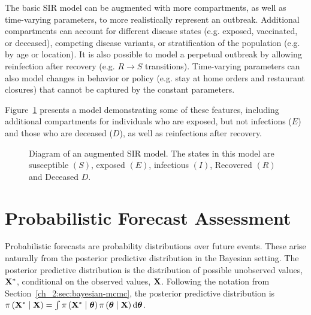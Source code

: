 The basic SIR model can be augmented with more compartments, as well as time-varying parameters, to more realistically represent an outbreak.
Additional compartments can account for different disease states (e.g. exposed, vaccinated, or deceased), competing disease variants, or stratification of the population (e.g. by age or location).
It is also possible to model a perpetual outbreak by allowing reinfection after recovery (e.g. \(R \to S\) transitions).
Time-varying parameters can also model changes in behavior or policy (e.g. stay at home orders and restaurant closures) that cannot be captured by the constant parameters.

Figure~\ref{fig:ch_2:SEIRDS_diagram} presents a model demonstrating some of these features, including additional compartments for individuals who are exposed, but not infections (\( E \)) and those who are deceased (\( D \)), as well as reinfections after recovery.

\begin{figure}
    \centering
    \caption{Diagram of an augmented SIR model.
    The states in this model are susceptible \( (S) \), exposed \( (E) \), infectious \( (I) \), Recovered \( (R) \) and Deceased \( D \).}
    \label{fig:ch_2:SEIRDS_diagram}
\end{figure}


\section{Probabilistic Forecast Assessment}
\label{sec:forecasting_techniques_and_assessment}

Probabilistic forecasts are probability distributions over future events.
These arise naturally  from the posterior predictive distribution in the Bayesian setting.
The posterior predictive distribution is the distribution of possible unobserved values, \( \mathbf{X}^* \), conditional on the observed values, \( \mathbf{X} \).
Following the notation from Section~\ref{ch_2:sec:bayesian-mcmc}, the posterior predictive distribution is \( \pi \left( \mathbf{X}^* \mid \mathbf{X} \right) = \int \pi \left( \mathbf{X}^* \mid \boldsymbol{\theta} \right) \pi \left( \boldsymbol{\theta} \mid \mathbf{X} \right) \mathrm{d} \boldsymbol{\theta} \).

